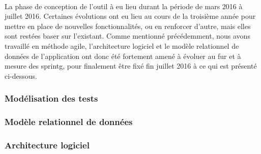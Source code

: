 \documentclass[12pt,a4paper]{report}
\begin{document}
\paragraph*{}La phase de conception de l'outil à eu lieu durant la période de mars 2016 à juillet 2016. Certaines évolutions ont eu lieu au cours de la troisième année pour mettre en place de nouvelles fonctionnalités, ou en renforcer d'autre, mais elles sont restées baser sur l'existant. Comme mentionné précédemment, nous avons travaillé en méthode agile, l'architecture logiciel et le modèle relationnel de données de l'application ont donc été fortement amené à évoluer au fur et à mesure des \gls{sprintg}, pour finalement être fixé fin juillet 2016 à ce qui est présenté ci-dessous. \\
\subsubsection{Modélisation des tests}
\paragraph*{}
\subsubsection{Modèle relationnel de données}
\paragraph*{}
\subsubsection{Architecture logiciel}
\end{document}
